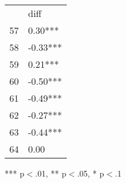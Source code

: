 \documentclass{article}
\begin{document}
\begin{table}[!h]
\centering
\begin{tabular}{ll}
\cline{1-2}
\multicolumn{1}{|l}{} &
  \multicolumn{1}{|l|}{diff} \\
\cline{1-2}
\multicolumn{1}{|l}{57} &
  \multicolumn{1}{|l|}{0.30***} \\
\cline{1-2}
\multicolumn{1}{|l}{58} &
  \multicolumn{1}{|l|}{-0.33***} \\
\cline{1-2}
\multicolumn{1}{|l}{59} &
  \multicolumn{1}{|l|}{0.21***} \\
\cline{1-2}
\multicolumn{1}{|l}{60} &
  \multicolumn{1}{|l|}{-0.50***} \\
\cline{1-2}
\multicolumn{1}{|l}{61} &
  \multicolumn{1}{|l|}{-0.49***} \\
\cline{1-2}
\multicolumn{1}{|l}{62} &
  \multicolumn{1}{|l|}{-0.27***} \\
\cline{1-2}
\multicolumn{1}{|l}{63} &
  \multicolumn{1}{|l|}{-0.44***} \\
\cline{1-2}
\multicolumn{1}{|l}{64} &
  \multicolumn{1}{|l|}{0.00} \\
\cline{1-2}
\end{tabular}

\footnotesize{
*** p$<$.01, ** p$<$.05, * p$<$.1
}
\end{table}
\end{document}
